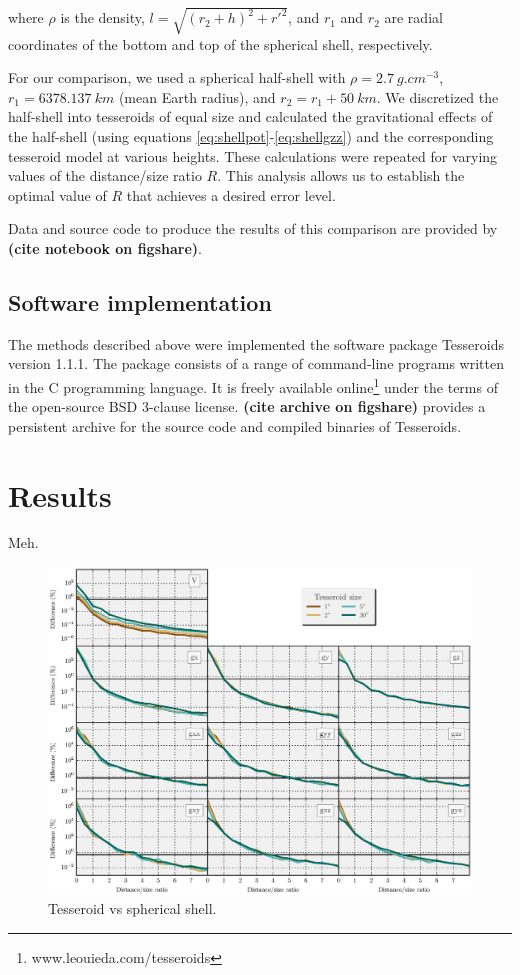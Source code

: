 \noindent
where $\rho$ is the density,
$l = \sqrt{(r_2 + h)^2 + {r'}^2}$,
and
$r_1$ and $r_2$ are radial coordinates of
the bottom and top of the spherical shell,
respectively.

For our comparison,
we used a spherical half-shell with
$\rho=2.7\ g.cm^{-3}$,
$r_1=6378.137\ km$ (mean Earth radius),
and
$r_2 = r_1 + 50\ km$.
We discretized the half-shell
into tesseroids of equal size
and calculated the gravitational effects of
the half-shell
(using equations \ref{eq:shellpot}-\ref{eq:shellgzz})
and the corresponding tesseroid model
at various heights.
These calculations were repeated
for varying values of
the distance/size ratio $R$.
This analysis
allows us to establish
the optimal value of $R$
that achieves a desired error level.

Data and source code to produce the results of this comparison
are provided by \textbf{(cite notebook on figshare)}.

\subsection{Software implementation}

The methods described above
were implemented the software package
Tesseroids version 1.1.1.
The package consists
of a range of command-line programs
written in the C programming language.
It is freely available
online\footnote{www.leouieda.com/tesseroids}
under the terms of
the open-source BSD 3-clause license.
\textbf{(cite archive on figshare)} provides a persistent
archive for the source code and compiled binaries of Tesseroids.


\section{Results}

Meh.

\begin{figure}
    \centering
    \includegraphics[width=\textwidth]{figs/tesseroid-x-shell}
    \caption{
        Tesseroid vs spherical shell.
    }
    \label{fig:tesseroid-x-shell}
\end{figure}

